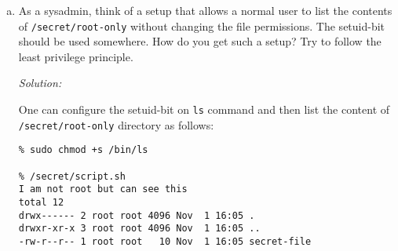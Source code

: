 \documentclass[a4paper,11pt]{article}
\newenvironment{solution}%
{\par{\noindent\small\textit{Solution:}}\vspace{-12pt}\begin{framed}}%
{\end{framed}\par}
\begin{document}
\begin{enumerate}[(a)]
\begin{verbatim}
mkdir -p /secret/root-only
chmod go-rwx /secret/root-only
echo "topsecret" > /secret/root-only/secret-file
\end{verbatim}
It creates a shell script /secret/script.sh (owner:root, group:root) with the
content:
\begin{verbatim}
#!/bin/sh 
echo "I am not root but can see this";
ls -al /secret/root-only
\end{verbatim}

It makes script.sh readable and executable by all 
(\verb|chmod o+rx /secret/script.sh|) and makes it setuid root 
(\verb|chmod +s /secret/script.sh|).

Now try to run script.sh without root access (e.g., using sudo) from a user
account with sudo permissions, i.e., the user can run sudo in general but you
do not use it here. What do you expect to see? What was the obtained output?
Can you explain the result?

\ifsolution\begin{solution}
I would expect to see the content of \emph{root-only} directory, but the output returned by the script is the following:
\begin{lstlisting}
% /secret/script.sh

I am not root but can see this
ls: cannot open directory /secret/root-only: Permission denied
\end{lstlisting}

An explanation of this behavior is that Linux normally ignores \cite{setuid} the setuid bit on all executable files starting with a shebang (\verb|#!|) symbol, because it presents a high security risk.

\end{solution}\fi

\item As a sysadmin, think of a setup that allows a normal user to list the
contents of \verb|/secret/root-only| without changing the file permissions. The
setuid-bit should be used somewhere. How do you get such a setup? Try to follow
the least privilege principle.

\ifsolution
\begin{solution}
One can configure the setuid-bit on \verb|ls| command and then list the content of \verb|/secret/root-only| directory as follows:

\begin{lstlisting}
% sudo chmod +s /bin/ls

% /secret/script.sh 
I am not root but can see this
total 12
drwx------ 2 root root 4096 Nov  1 16:05 .
drwxr-xr-x 3 root root 4096 Nov  1 16:05 ..
-rw-r--r-- 1 root root   10 Nov  1 16:05 secret-file
\end{lstlisting}

\end{solution}\fi


\end{enumerate}
\end{document}
